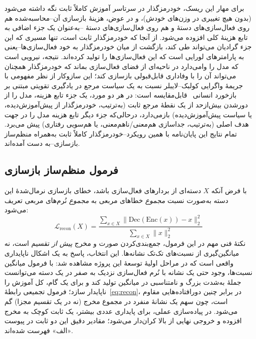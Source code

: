 برای مهار این ریسک، خودرمزگذار در سرتاسر آموزش کاملاً ثابت نگه داشته می‌شود (بدون هیچ تغییری در وزن‌های خودش)، و در عوض، هزینهٔ بازسازی آن--محاسبه‌شده هم روی فعال‌سازی‌های دستهٔ
و هم روی فعال‌سازی‌های دستهٔ
--به‌عنوان یک جزء اضافی به تابع هزینهٔ کلی افزوده می‌شود. از آنجا که خودرمزگذار ثابت است، تنها مسیری که این جزء گرادیان می‌تواند طی کند، بازگشت از میان خودرمزگذار به خود فعال‌سازی‌ها--یعنی به پارامترهای لورایی است که این فعال‌سازی‌ها را تولید کرده‌اند. نتیجه، نیرویی است که مدل را وامی‌دارد در ناحیه‌ای از فضای فعال‌سازی بماند که خودرمزگذار همچنان می‌تواند آن را با وفاداری قابل‌قبولی بازسازی کند؛ این سازوکار از نظر مفهومی با جریمهٔ واگرایی کولبک--لایبلر نسبت به یک سیاست مرجع در یادگیری تقویتی مبتنی بر بازخورد انسانی~\cite{ouyang2022instructgpt} قابل‌مقایسه است: در هر دو مورد، یک جزء تابع هزینه، مدل را از دورشدن بیش‌ازحد از یک نقطهٔ مرجع ثابت (به‌ترتیب، خودرمزگذار از پیش‌آموزش‌دیده، یا سیاست پیش‌آموزش‌دیده) بازمی‌دارد، درحالی‌که جزء دیگر تابع هزینه مدل را در جهت هدف اصلی (به‌ترتیب، جداسازی هم‌معنی/ناهم‌معنی، یا هم‌سویی رفتاری) پیش می‌برد. تمام نتایج این پایان‌نامه با همین رویکرد--خودرمزگذار کاملاً ثابت به‌همراه منظم‌ساز بازسازی--به دست آمده‌اند.

\subsection{فرمول منظم‌ساز بازسازی}
با فرض آنکه
$X$
دسته‌ای از بردارهای فعال‌سازی باشد، خطای بازسازی نرمال‌شدهٔ این دسته به‌صورت نسبت \emph{مجموع} خطاهای مربعی به \emph{مجموع} نُرم‌های مربعی تعریف می‌شود:
\begin{equation}
\label{eq:recon}
\mathcal{L}_{\mathrm{recon}}(X) = \frac{\sum_{x \in X} \lVert \mathrm{Dec}(\mathrm{Enc}(x)) - x \rVert_2^2}{\sum_{x \in X} \lVert x \rVert_2^2}
\end{equation}
نکتهٔ فنی مهم در این فرمول، جمع‌بندی‌کردن صورت و مخرج \emph{پیش از} تقسیم است، نه میانگین‌گیری از نسبت‌های تک‌تک نشانه‌ها. این انتخاب، پاسخ به یک اشکال ناپایداری واقعی است که در مراحل اولیهٔ توسعهٔ این پروژه مشاهده شد: با فرمول میانگین نسبت‌ها، وجود حتی یک نشانه با نُرم فعال‌سازی نزدیک به صفر در یک دسته می‌توانست جملهٔ به‌شدت بزرگ و نامتناسبی در میانگین تولید کند و برای یک گام، کل آموزش را ناپایدار سازد؛ فرمول تجمیعی رابطهٔ~\ref{eq:recon}، در برابر چنین دورافتاده‌هایی مقاوم است، چون سهم یک نشانهٔ منفرد در مجموع مخرج (نه در یک تقسیم مجزا) گم می‌شود. در پیاده‌سازی عملی، برای پایداری عددی بیشتر، یک ثابت کوچک به مخرج افزوده و خروجی نهایی از بالا کران‌دار می‌شود؛ مقادیر دقیق این دو ثابت در پیوست «الف» فهرست شده‌اند.

